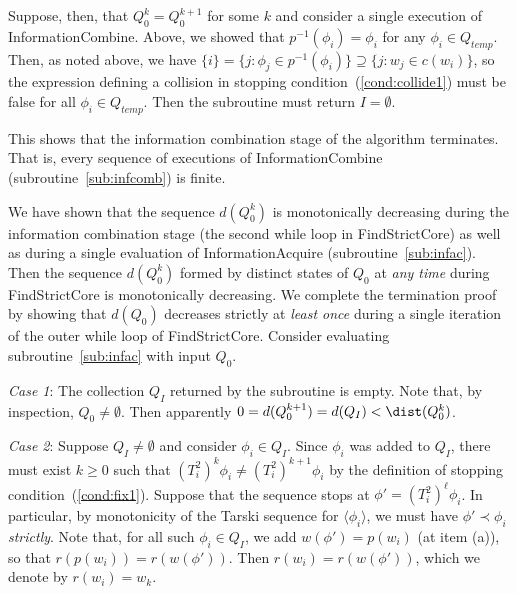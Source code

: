\documentclass[11pt,reqno]{amsart}
\theoremstyle{definition}
\numberwithin{equation}{section}
\newcommand{\inv}{^{-1}}
\newcommand{\lag}{\langle}
\newcommand{\rag}{\rangle}
\newcommand{\pre}{\phi}
\newcommand{\pe}{\prec}
\newcommand{\acto}{Q_0}
\newcommand{\actok}{Q_0^k}
\newcommand{\actc}{Q_I}
\newcommand{\actt}{Q_{temp}}
\newcommand{\disto}{d}
\newcommand{\infacstoptha}{(a)\xspace}
\begin{document}
Suppose, then, that $\actok = \acto^{k+1}$ for some $k$ and consider a single execution of InformationCombine. 
Above, we showed that $p\inv(\pre_i) = \pre_i$ for any $\pre_i \in \actt$.
Then, as noted above, we have $\{i\} = \{j: \pre_j \in p\inv(\pre_i)\} \supseteq \{j: w_j \in c(w_i)\}$, so the expression defining a collision in stopping condition~(\ref{cond:collide1}) must be false for all $\pre_i \in \actt$. Then the subroutine must return $I = \emptyset$. 

This shows that the information combination stage of the algorithm terminates.
That is, every sequence of executions of InformationCombine (subroutine~\ref{sub:infcomb}) is finite.

We have shown that the sequence $\disto(\actok)$ is monotonically decreasing during the information combination stage (the second while loop in FindStrictCore) as well as during a single evaluation of InformationAcquire (subroutine~\ref{sub:infac}).
Then the sequence $\disto(\actok)$ formed by distinct states of $\acto$ at \emph{any time} during FindStrictCore is monotonically decreasing.  
We complete the termination proof by showing that $\disto(\acto)$ decreases strictly at \emph{least once} during a single iteration of the outer while loop of FindStrictCore.
Consider evaluating subroutine~\ref{sub:infac} with input $\acto$. 

\emph{Case 1}: The collection $\actc$ returned by the subroutine is empty.
Note that, by inspection, $\acto \not = \emptyset$. 
Then apparently $0 = \disto(\acto^{k+1}) = \disto(\actc) < \dist(\actok)$. 

\emph{Case 2}: Suppose $\actc \not = \emptyset$ and consider $\pre_i \in \actc$.
Since $\pre_i$ was added to $\actc$, there must exist $k \geq 0$ such that $(T_i^2)^k \pre_i \not = (T_i^2)^{k+1} \pre_i$ by the definition of stopping condition~(\ref{cond:fix1}).  
Suppose that the sequence stops at $\pre' = (T_i^2)^{\ell} \pre_i$.
In particular, by monotonicity of the Tarski sequence for $\lag \pre_i \rag$, we must have $\pre' \pe \pre_i$ \emph{strictly}.
Note that, for all such $\pre_i \in \actc$, we add $w(\pre') = p(w_i)$ (at item \infacstoptha), so that $r(p(w_i)) = r(w(\pre'))$.
Then $r(w_i) = r(w(\pre'))$, which we denote by $r(w_i) = w_k$.
\end{document}
